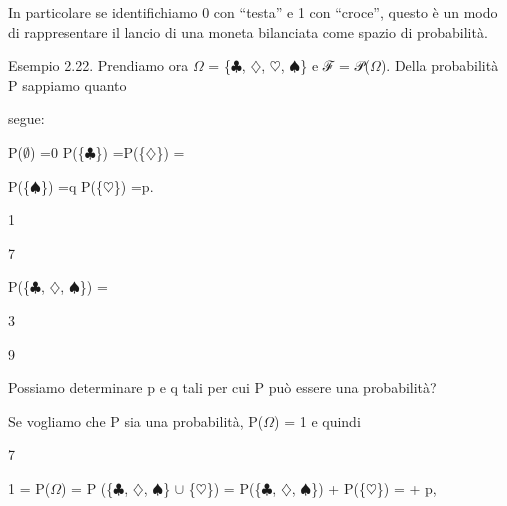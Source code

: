 \documentclass[a4paper,portrait,12pt]{article}
\begin{document}
\begin{flushleft}
In particolare se identifichiamo 0 con ``testa'' e 1 con ``croce'', questo \`{e} un modo di rappresentare il lancio di una moneta bilanciata come spazio di probabilit\`{a}.
\end{flushleft}


\begin{flushleft}
Esempio 2.22. Prendiamo ora $\Omega$ = \{$\clubsuit$, $\diamondsuit$, $\heartsuit$, $\spadesuit$\} e ℱ = 𝒫($\Omega$). Della probabilit\`{a} P sappiamo quanto
\end{flushleft}


\begin{flushleft}
segue:
\end{flushleft}


\begin{flushleft}
P($\emptyset$) =0 P(\{$\clubsuit$\}) =P(\{$\diamondsuit$\}) =
\end{flushleft}


\begin{flushleft}
P(\{$\spadesuit$\}) =q P(\{$\heartsuit$\}) =p.
\end{flushleft}





1


7


\begin{flushleft}
P(\{$\clubsuit$, $\diamondsuit$, $\spadesuit$\}) =
\end{flushleft}


3


9





\begin{flushleft}
Possiamo determinare p e q tali per cui P pu\`{o} essere una probabilit\`{a}?
\end{flushleft}


\begin{flushleft}
Se vogliamo che P sia una probabilit\`{a}, P($\Omega$) = 1 e quindi
\end{flushleft}


7


\begin{flushleft}
1 = P($\Omega$) = P (\{$\clubsuit$, $\diamondsuit$, $\spadesuit$\} $\cup$ \{$\heartsuit$\}) = P(\{$\clubsuit$, $\diamondsuit$, $\spadesuit$\}) + P(\{$\heartsuit$\}) = + p,
\end{flushleft}
\end{document}
